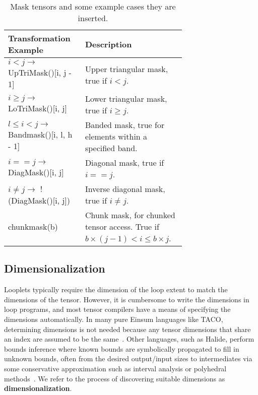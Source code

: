     \begin{table}[h]
        \scriptsize
        \centering
        \begin{tabular}{|>{\raggedright\arraybackslash}m{0.3\linewidth}|>{\raggedright\arraybackslash}m{0.4\linewidth}|}
        \hline
        \textbf{Transformation Example} & \textbf{Description} \\
        \hline
        $i < j \rightarrow$ UpTriMask()[i, j - 1] & Upper triangular mask, true if $i < j$. \\
        \hline
        $i \geq j \rightarrow$ LoTriMask()[i, j] & Lower triangular mask, true if $i \geq j$. \\
        \hline
        $l \leq i < j \rightarrow$ Bandmask()[i, l, h - 1] & Banded mask, true for elements within a specified band. \\
        \hline
        $i == j \rightarrow$ DiagMask()[i, j] & Diagonal mask, true if $i == j$. \\
        \hline
        $i \neq j \rightarrow$ !(DiagMask()[i, j]) & Inverse diagonal mask, true if $i \neq j$. \\
        \hline
        chunkmask(b) & Chunk mask, for chunked tensor access. True if $b \times (j - 1) < i \leq b \times j$. \\
        \hline
        \end{tabular}
        \caption{Mask tensors and some example cases they are inserted.}
        \label{table:masks}
    \end{table}
    
\subsection{Dimensionalization}
    Looplets typically require the dimension of the loop extent to match the dimensions of the tensor. 
    However, it is cumbersome to write the dimensions
    in loop programs, and most tensor compilers have a means of specifying the dimensions automatically.
    In many pure Einsum languages like TACO, determining dimensions
    is not needed because any tensor dimensions that share an index are assumed to be the same~\cite{kjolstad_tensor_2017}.
    Other languages, such as Halide, perform bounds inference where
    known bounds are symbolically propagated to fill in unknown bounds, often from the desired output/input sizes to intermediates via some conservative approximation such as interval analysis or polyhedral methods~\cite{ragan-kelley_halide_2013, grosser2012polly}.
    We refer to the process of discovering suitable
    dimensions as \textbf{dimensionalization}. 


